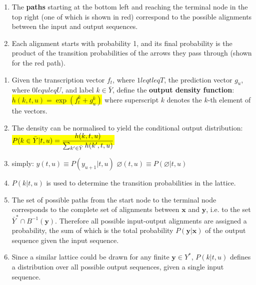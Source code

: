 \begin{table}[H]
\begin{minipage}{0.65\linewidth}
\begin{enumerate}
    \item The \textbf{paths} starting at the bottom left and reaching the terminal node in the top right (one of which is shown in red) correspond to the possible alignments between the input and output sequences. 
    \hfill \cite{arxiv/1211.3711/Sequence-Transduction-RNN}
    
    \item Each alignment starts with probability 1, and its final probability is the product of the transition probabilities of the arrows they pass through (shown for the red path).
    \hfill \cite{arxiv/1211.3711/Sequence-Transduction-RNN}
\end{enumerate}
\end{minipage}
\end{table}


\begin{enumerate}
    \item Given the transcription vector $f_t$, where $1 leq t leq T $, the prediction vector $g_u$, where $0 leq u leq U $, and label $k \in \bar{Y}$, define the \textbf{output density function}:
    \colorbox{yellow}{$h(k, t, u) = \exp (f ^k _t + g^k _u ) $}
    where superscript $k$ denotes the $k$-th element of the vectors. 
    \hfill \cite{arxiv/1211.3711/Sequence-Transduction-RNN}

    \item The density can be normalised to yield the conditional output distribution:
    \colorbox{yellow}{$P(k \in \bar{Y}|t, u) = \dfrac{h(k, t, u)}{\textstyle\sum_{k^\prime \in \bar{Y}} h(k^\prime, t, u)}$}
    \hfill \cite{arxiv/1211.3711/Sequence-Transduction-RNN}

    \item simply: 
    \hfill
    $ y(t, u) \equiv P(y_{u+1}|t, u) $
    \hfill
    $ \varnothing(t, u) \equiv P(\varnothing|t, u) $
    \hfill \cite{arxiv/1211.3711/Sequence-Transduction-RNN}

    \item $P(k|t, u)$ is used to determine the transition probabilities in the lattice.
    \hfill \cite{arxiv/1211.3711/Sequence-Transduction-RNN}

    \item The set of possible paths from the start node to the terminal node corresponds to the complete set of alignments between $\bm{x}$ and $\bm{y}$, i.e. to the set $\bar{Y}^\ast \cap B^{-1}(\bm{y})$. 
    Therefore all possible input-output alignments are assigned a probability, the sum of which is the total probability $P(\bm{y}|\bm{x})$ of the output sequence given the input sequence.
    \hfill \cite{arxiv/1211.3711/Sequence-Transduction-RNN}

    \item Since a similar lattice could be drawn for any finite $\bm{y} \in Y^\ast$, $P(k|t, u)$ defines a distribution over all possible output sequences, given a single input sequence.
    \hfill \cite{arxiv/1211.3711/Sequence-Transduction-RNN}
\end{enumerate}




